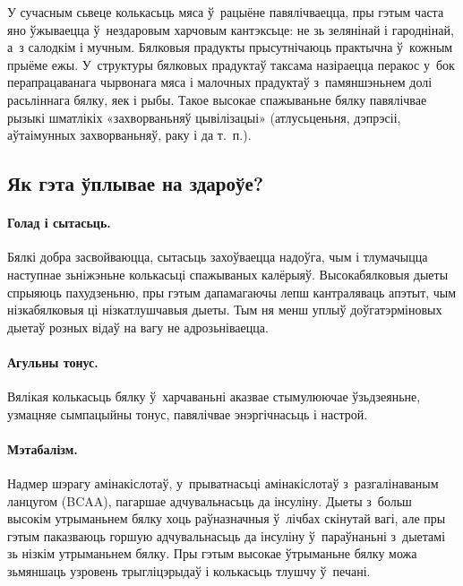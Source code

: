 
У сучасным сьвеце колькасьць мяса ў~рацыёне павялічваецца, пры гэтым часта яно ўжываецца ў~нездаровым харчовым кантэксьце: не зь зелянінай і гароднінай, а~з салодкім і мучным. Бялковыя прадукты прысутнічаюць практычна ў~кожным прыёме ежы. У~структуры бялковых прадуктаў таксама назіраецца перакос у~бок перапрацаванага чырвонага мяса і малочных прадуктаў з~памяншэньнем долі расьліннага бялку, яек і рыбы. Такое высокае спажываньне бялку павялічвае рызыкі шматлікіх «захворваньняў цывілізацыі» (атлусьценьня, дэпрэсіі, аўтаімунных захворваньняў, раку і да т.~п.).

\subsection{Як гэта ўплывае на здароўе?}

\paragraph{Голад і сытасьць.}
Бялкі добра засвойваюцца, сытасьць захоўваецца надоўга, чым і тлумачыцца наступнае зьніжэньне колькасьці спажываных калёрыяў. Высокабялковыя дыеты спрыяюць пахудзеньню, пры гэтым дапамагаючы лепш кантраляваць апэтыт, чым нізкабялковыя ці нізкатлушчавыя дыеты. Тым ня менш уплыў доўгатэрміновых дыетаў розных відаў на вагу не адрозьніваецца.

\paragraph{Агульны тонус.}
Вялікая колькасьць бялку ў~харчаваньні аказвае стымулюючае ўзьдзеяньне, узмацняе сымпацыйны тонус, павялічвае энэргічнасьць і настрой.

\paragraph{Мэтабалізм.}
Надмер шэрагу амінакіслотаў, у~прыватнасьці амінакіслотаў з~разгалінаваным ланцугом (BCAA), пагаршае адчувальнасьць да інсуліну. Дыеты з~больш высокім утрыманьнем бялку хоць раўназначныя ў~лічбах скінутай вагі, але пры гэтым паказваюць горшую адчувальнасьць да інсуліну ў~параўнаньні з~дыетамі зь нізкім утрыманьнем бялку. Пры гэтым высокае ўтрыманьне бялку можа зьмяншаць узровень трыгліцэрыдаў і колькасьць тлушчу ў~печані.

